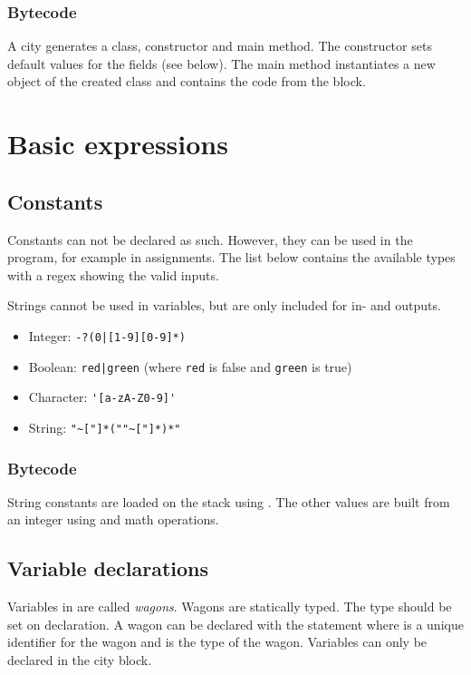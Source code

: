 \subsubsection*{Bytecode}

A city generates a class, constructor and main method. The constructor sets default values for the fields (see below). The main method instantiates a new object of the created class and contains the code from the  block.

\section{Basic expressions}

\subsection{Constants}

Constants can not be declared as such. However, they can be used in the program, for example in assignments. The list below contains the available types with a regex showing the valid inputs.

Strings cannot be used in variables, but are only included for in- and outputs.

\begin{itemize}
\item Integer: \verb=-?(0|[1-9][0-9]*)=
\item Boolean: \verb=red|green= (where \verb|red| is false and \verb|green| is true)
\item Character: \verb='[a-zA-Z0-9]'=
\item String: \verb="~["]*(""~["]*)*"=
\end{itemize}

\subsubsection*{Bytecode}

String constants are loaded on the stack using . The other values are built from an integer using  and math operations.

\subsection{Variable declarations}

Variables in \shortname are called \emph{wagons}. Wagons are statically typed. The type should be set on declaration.
A wagon can be declared with the statement  where  is a unique identifier for the wagon and  is the type of the wagon. Variables can only be declared in the  city block.

